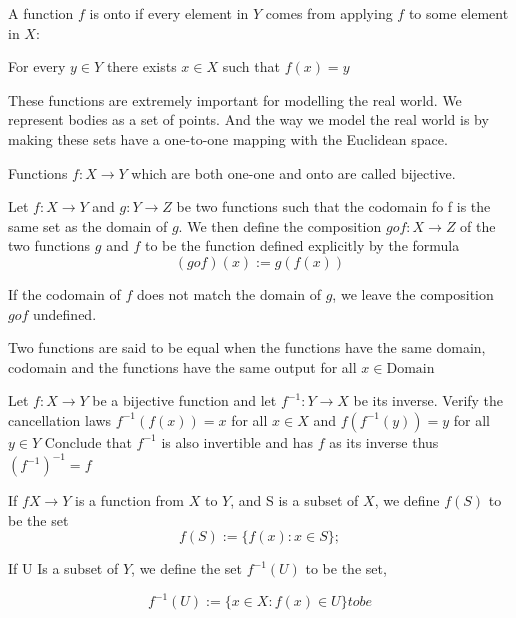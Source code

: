 \documentclass[11pt]{report}
\begin{document}
\begin{definition}
	A function $f$ is onto if every element in $Y$ comes from applying $f$ to some element in $X$:

	For every $y \in Y$ there exists $x \in X$ such that $f(x) = y$
\end{definition}
These functions are extremely important for modelling the real world. We represent bodies as a set of points. And the way we model the real world is by making these sets have a one-to-one mapping with the Euclidean space.
\begin{definition}
	Functions $f: X \rightarrow Y$ which are both one-one and onto are called bijective.
\end{definition}
\begin{definition}
	Let $f: X \rightarrow Y$ and $g: Y \rightarrow Z$ be two functions such that the codomain fo f is the same set as the domain of $g$. We then define the composition $g o f: X \rightarrow Z$ of the two functions $g$ and $f$ to be the function defined explicitly by the formula
	\[
		(g o f)(x) := g(f(x))
	\]

	If the codomain of $f$ does not match the domain of $g$, we leave the composition $g o f$ undefined.
\end{definition}
\begin{definition}
	Two functions are said to be equal when the functions have the same domain, codomain and the functions have the same output for all $x \in \text{Domain}$
\end{definition}
\begin{prop}
	Let $f: X \rightarrow Y$ be a bijective function and let $f^{-1}: Y \rightarrow X$ be its inverse. Verify the cancellation laws $f^{-1}(f(x)) = x$ for all $x \in X$ and $f(f^{-1}(y))= y$ for all $y \in Y$ Conclude that $f^{-1}$ is also invertible and has $f$ as its inverse thus ${(f^{-1})}^{-1} = f$
\end{prop}
\begin{definition}[Images]
	If $f X \rightarrow Y$ is a function from $X$ to $Y$, and S is a subset of $X$, we define $f(S)$ to be the set
	$$f(S) := \{f(x): x \in S\};$$
\end{definition}
\begin{definition}
	If U Is a subset of $Y$, we define the set $f^{-1}(U)$ to be the set,

	\[f^{-1}(U) := \{x \in X: f(x) \in U\}to be \]
\end{definition}
\end{document}

